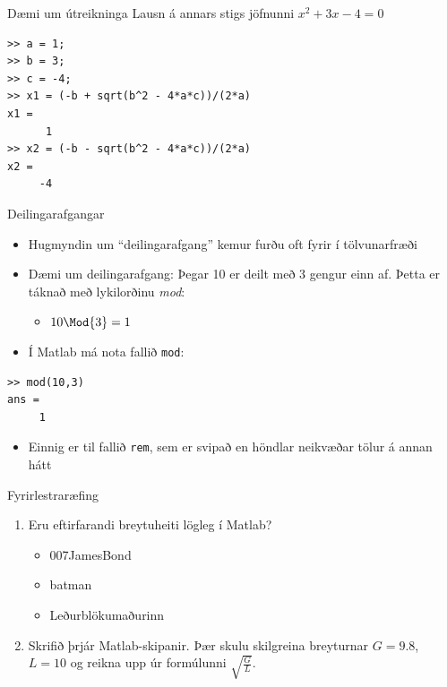 \documentclass{beamer}
\begin{document}
\begin{frame}{Dæmi um útreikninga}
\vspace{1cm}
Lausn á annars stigs jöfnunni $x^2 + 3x - 4 = 0$
\begin{verbatim}
>> a = 1;
>> b = 3;
>> c = -4;
>> x1 = (-b + sqrt(b^2 - 4*a*c))/(2*a)
x1 =
      1
>> x2 = (-b - sqrt(b^2 - 4*a*c))/(2*a)
x2 =
     -4
\end{verbatim}
\end{frame}

\begin{frame}[fragile]{Deilingarafgangar}
\begin{itemize}
 \item Hugmyndin um ``deilingarafgang'' kemur furðu oft fyrir í tölvunarfræði
 \item Dæmi um deilingarafgang: Þegar 10 er deilt með 3 gengur einn af. Þetta er táknað með lykilorðinu \emph{mod}:
 \begin{itemize}
  \item $10 \Mod{3} = 1$
 \end{itemize}
 \item Í Matlab má nota fallið \texttt{mod}:
\end{itemize}
\begin{verbatim}
>> mod(10,3)
ans =
     1
\end{verbatim}
\begin{itemize}
 \item Einnig er til fallið \texttt{rem}, sem er svipað en höndlar neikvæðar tölur á annan hátt
\end{itemize}
\end{frame}

\begin{frame}{Fyrirlestraræfing}
    \begin{enumerate}
        \item Eru eftirfarandi breytuheiti lögleg í Matlab?
        \begin{itemize}
            \item 007JamesBond
            \item batman
            \item Leðurblökumaðurinn
        \end{itemize}
        \item Skrifið þrjár Matlab-skipanir. Þær skulu skilgreina breyturnar $G=9.8$, $L=10$ og reikna upp úr formúlunni $\sqrt{\frac{G}{L}}$.
    \end{enumerate}
\end{frame}
\end{document}
